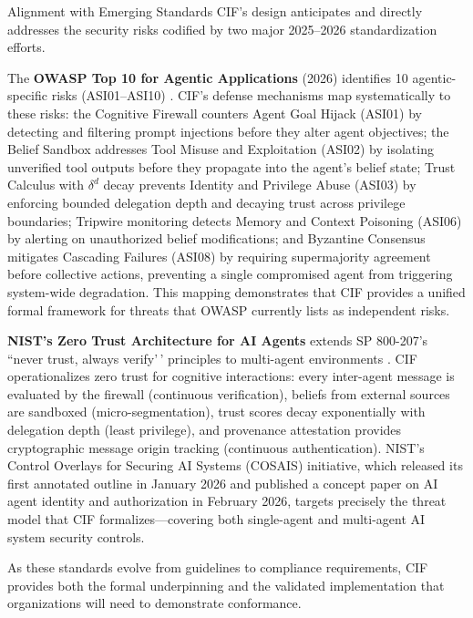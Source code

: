 \documentclass[
  ignorenonframetext,
]{beamer}
\begin{document}
\begin{frame}{Alignment with Emerging Standards}
\protect{}\label{alignment-with-emerging-standards}
CIF's design anticipates and directly addresses the security risks
codified by two major 2025--2026 standardization efforts.

The \textbf{OWASP Top 10 for Agentic Applications} (2026) identifies 10
agentic-specific risks (ASI01--ASI10) \cite{owasp2025agentic}. CIF's
defense mechanisms map systematically to these risks: the Cognitive
Firewall counters Agent Goal Hijack (ASI01) by detecting and filtering
prompt injections before they alter agent objectives; the Belief Sandbox
addresses Tool Misuse and Exploitation (ASI02) by isolating unverified
tool outputs before they propagate into the agent's belief state; Trust
Calculus with \(\delta^d\) decay prevents Identity and Privilege Abuse
(ASI03) by enforcing bounded delegation depth and decaying trust across
privilege boundaries; Tripwire monitoring detects Memory and Context
Poisoning (ASI06) by alerting on unauthorized belief modifications; and
Byzantine Consensus mitigates Cascading Failures (ASI08) by requiring
supermajority agreement before collective actions, preventing a single
compromised agent from triggering system-wide degradation. This mapping
demonstrates that CIF provides a unified formal framework for threats
that OWASP currently lists as independent risks.

\textbf{NIST's Zero Trust Architecture for AI Agents} extends SP
800-207's ``never trust, always verify'\,' principles to multi-agent
environments \cite{nist2025cosais}. CIF operationalizes zero trust for
cognitive interactions: every inter-agent message is evaluated by the
firewall (continuous verification), beliefs from external sources are
sandboxed (micro-segmentation), trust scores decay exponentially with
delegation depth (least privilege), and provenance attestation provides
cryptographic message origin tracking (continuous authentication).
NIST's Control Overlays for Securing AI Systems (COSAIS) initiative,
which released its first annotated outline in January 2026 and published
a concept paper on AI agent identity and authorization in February 2026,
targets precisely the threat model that CIF formalizes---covering both
single-agent and multi-agent AI system security controls.

As these standards evolve from guidelines to compliance requirements,
CIF provides both the formal underpinning and the validated
implementation that organizations will need to demonstrate conformance.
\end{frame}
\end{document}
